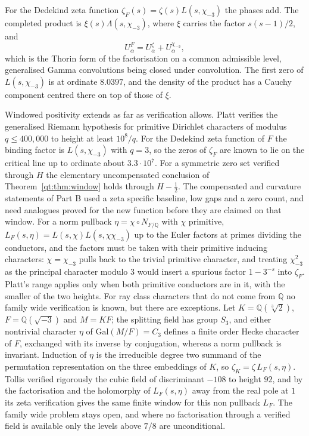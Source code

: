 For the Dedekind zeta function $\zeta_F(s)=\zeta(s)L(s,\chi_{-3})$ the phases add. The completed product is $\xi(s)\Lambda(s,\chi_{-3})$, where $\xi$ carries the factor $s(s-1)/2$, and
\[
U_\alpha^F=U_\alpha^{\zeta}+U_\alpha^{\chi_{-3}},
\]
which is the Thorin form of the factorisation on a common admissible level, generalised Gamma convolutions being closed under convolution. The first zero of $L(s,\chi_{-3})$ is at ordinate $8.0397$, and the density of the product has a Cauchy component centred there on top of those of $\xi$.

Windowed positivity extends as far as verification allows. Platt \cite{Platt16} verifies the generalised Riemann hypothesis for primitive Dirichlet characters of modulus $q\le400{,}000$ to height at least $10^8/q$. %
For the Dedekind zeta function of $F$ the binding factor is $L(s,\chi_{-3})$ with $q=3$, so the zeros of $\zeta_F$ are known to lie on the critical line up to ordinate about $3.3\cdot10^7$. For a symmetric zero set verified through $H$ the elementary uncompensated conclusion of Theorem~\ref{qt:thm:window} holds through $H-\frac12$. The compensated and curvature statements of Part B used a zeta specific baseline, low gaps and a zero count, and need analogues proved for the new function before they are claimed on that window. For a norm pullback $\eta=\chi\circ N_{F/\mathbb Q}$ with $\chi$ primitive, $L_F(s,\eta)=L(s,\chi)L(s,\chi\chi_{-3})$ up to the Euler factors at primes dividing the conductors, and the factors must be taken with their primitive inducing characters: $\chi=\chi_{-3}$ pulls back to the trivial primitive character, and treating $\chi_{-3}^2$ as the principal character modulo $3$ would insert a spurious factor $1-3^{-s}$ into $\zeta_F$. Platt's range applies only when both primitive conductors are in it, with the smaller of the two heights. For ray class characters that do not come from $\mathbb Q$ no family wide verification is known, but there are exceptions. Let $K=\mathbb Q(\sqrt[3]2)$, $F=\mathbb Q(\sqrt{-3})$ and $M=KF$; the splitting field has group $S_3$, and either nontrivial character $\eta$ of $\mathrm{Gal}(M/F)=C_3$ defines a finite order Hecke character of $F$, exchanged with its inverse by conjugation, whereas a norm pullback is invariant. Induction of $\eta$ is the irreducible degree two summand of the permutation representation on the three embeddings of $K$, so $\zeta_K=\zeta\,L_F(s,\eta)$. Tollis verified rigorously the cubic field of discriminant $-108$ to height $92$, and by the factorisation and the holomorphy of $L_F(s,\eta)$ away from the real pole at $1$ its zeta verification gives the same finite window for this non pullback $L_F$. The family wide problem stays open, and where no factorisation through a verified field is available only the levels above $7/8$ are unconditional.

